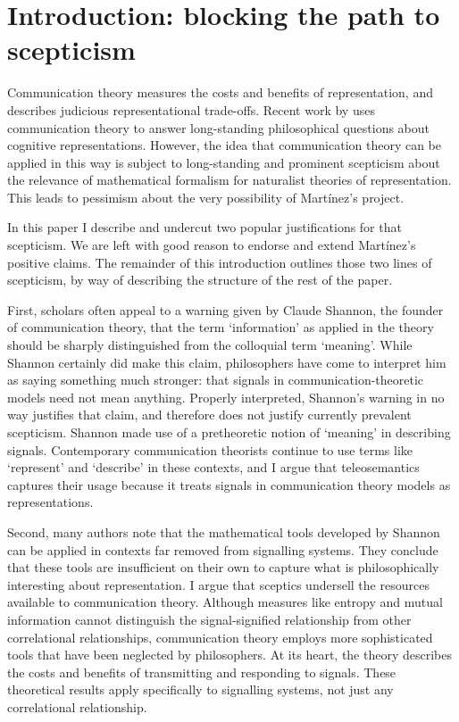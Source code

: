 \section{Introduction: blocking the path to scepticism}\label{sec:intro}

Communication theory measures the costs and benefits of representation, and describes judicious representational trade-offs. 
Recent work by \citet{martinez2019deception,martinez2019representations} uses communication theory to answer long-standing philosophical questions about cognitive representations.
However, the idea that communication theory can be applied in this way is subject to long-standing and prominent scepticism about the relevance of mathematical formalism for naturalist theories of representation.
This leads to pessimism about the very possibility of Mart\'{i}nez's project.

In this paper I describe and undercut two popular justifications for that scepticism.
We are left with good reason to endorse and extend Mart\'{i}nez's positive claims.
The remainder of this introduction outlines those two lines of scepticism, by way of describing the structure of the rest of the paper.

First, scholars often appeal to a warning given by Claude Shannon, the founder of communication theory, that the term `information' as applied in the theory should be sharply distinguished from the colloquial term `meaning'.
While Shannon certainly did make this claim, philosophers have come to interpret him as saying something much stronger: that signals in communication-theoretic models need not mean anything.
Properly interpreted, Shannon's warning in no way justifies that claim, and therefore does not justify currently prevalent scepticism.
Shannon made use of a pretheoretic notion of `meaning' in describing signals.
Contemporary communication theorists continue to use terms like `represent' and `describe' in these contexts, and I argue that teleosemantics captures their usage because it treats signals in communication theory models as representations.

Second, many authors note that the mathematical tools developed by Shannon can be applied in contexts far removed from signalling systems.
They conclude that these tools are insufficient on their own to capture what is philosophically interesting about representation.
I argue that sceptics undersell the resources available to communication theory.
Although measures like entropy and mutual information cannot distinguish the signal-signified relationship from other correlational relationships, communication theory employs more sophisticated tools that have been neglected by philosophers.
At its heart, the theory describes the costs and benefits of transmitting and responding to signals.
These theoretical results apply specifically to signalling systems, not just any correlational relationship.


